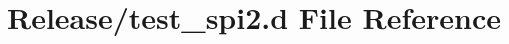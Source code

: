\hypertarget{test__spi2_8d}{}\section{Release/test\+\_\+spi2.d File Reference}
\label{test__spi2_8d}
